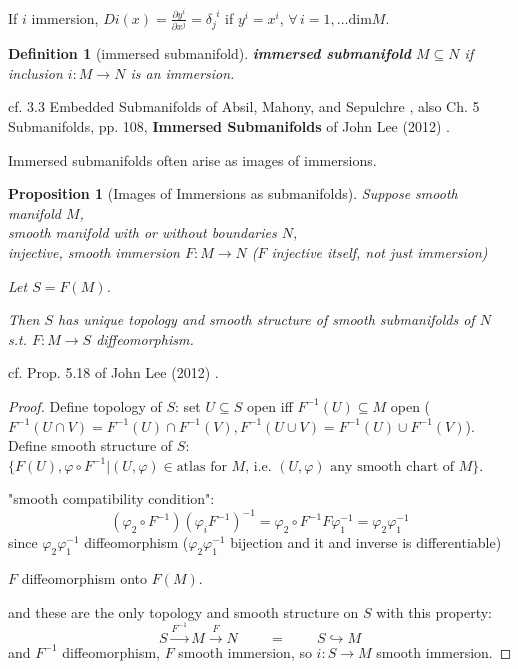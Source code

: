 \documentclass[10pt]{amsart}
\newtheorem{proposition}{Proposition}
\newtheorem{definition}{Definition}
\begin{document}
\begin{multicols*}{2}
	If $i$ immersion, $Di(x) = \frac{\partial y^i}{ \partial x^j} = \delta_j^{\  \  i}$ if $y^i = x^i$, $\forall \, i =1,\dots \text{dim}M$.  
	
\begin{definition}[immersed submanifold]
	\textbf{immersed submanifold} $M \subseteq N$ if inclusion $i:M\to N$ is an immersion.  
\end{definition}	
cf. 3.3 Embedded Submanifolds of Absil, Mahony, and Sepulchre \cite{AMS2008}, also Ch. 5 Submanifolds, pp. 108, \textbf{Immersed Submanifolds} of  John Lee (2012) \cite{JLee2012}.  

Immersed submanifolds often arise as images of immersions.  

\begin{proposition}[Images of Immersions as submanifolds]
	Suppose smooth manifold $M$, \\
	\phantom{Suppose } smooth manifold with or without boundaries $N$, \\
	injective, smooth immersion $F:M\to N$ ($F$ injective itself, not just immersion)  
	
Let $S=F(M)$.  

Then $S$ has unique topology and smooth structure of smooth submanifolds of $N$ s.t. $F:M\to S$ diffeomorphism.  
	
\end{proposition}
cf. Prop. 5.18 of John Lee (2012) \cite{JLee2012}.  

\begin{proof}
Define topology of $S$: set $U\subseteq S$ open iff $F^{-1}(U) \subseteq M$ open ($F^{-1}(U\cap V) = F^{-1}(U) \cap F^{-1}(V), F^{-1}(U\cup V) =F^{-1}(U) \cup F^{-1}(V)$).  \\
Define smooth structure of $S$: $\lbrace F(U), \varphi \circ F^{-1}  | (U,\varphi) \in \text{atlas for $M$, i.e. $(U,\varphi)$ any smooth chart of $M$}\rbrace$.  

"smooth compatibility condition": 
\[
(\varphi_2\circ F^{-1}) (\varphi_i F^{-1})^{-1} = \varphi_2 \circ F^{-1}F\varphi_1^{-1} = \varphi_2 \varphi_1^{-1}
\]
since $\varphi_2\varphi_1^{-1}$ diffeomorphism ($\varphi_2 \varphi_1^{-1}$ bijection and it and inverse is differentiable) 

$F$ diffeomorphism onto $F(M)$.  

	and these are the only topology and smooth structure on $S$ with this property: 
	\[
	S \xrightarrow{F^{-1}} M \xrightarrow{F} N \qquad \, = \qquad \, S \hookrightarrow M
	\]
	and $F^{-1}$ diffeomorphism, $F$ smooth immersion, so $i : S \to M$ smooth immersion.  
	\end{proof}


\end{multicols*}
\end{document}
